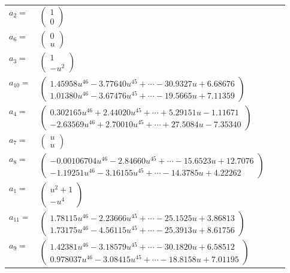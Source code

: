 \documentclass[1p]{elsarticle_modified}
\theoremstyle{definition}
\begin{document}
\begin{tabular}{m{7pt} m{180pt} m{7pt} m{180pt} }
\flushright $a_{2}=$&$\begin{pmatrix}1\\0\end{pmatrix}$ \\
\flushright $a_{6}=$&$\begin{pmatrix}0\\u\end{pmatrix}$ \\
\flushright $a_{3}=$&$\begin{pmatrix}1\\- u^2\end{pmatrix}$ \\
\flushright $a_{10}=$&$\begin{pmatrix}1.45958 u^{46}-3.77640 u^{45}+\cdots-30.9327 u+6.68676\\1.01380 u^{46}-3.67476 u^{45}+\cdots-19.5665 u+7.11359\end{pmatrix}$ \\
\flushright $a_{4}=$&$\begin{pmatrix}0.302165 u^{46}+2.44020 u^{45}+\cdots+5.29151 u-1.11671\\-2.63569 u^{46}+2.70010 u^{45}+\cdots+27.5084 u-7.35340\end{pmatrix}$ \\
\flushright $a_{7}=$&$\begin{pmatrix}u\\u\end{pmatrix}$ \\
\flushright $a_{8}=$&$\begin{pmatrix}-0.00106704 u^{46}-2.84660 u^{45}+\cdots-15.6523 u+12.7076\\-1.19251 u^{46}-3.16155 u^{45}+\cdots-14.3785 u+4.22262\end{pmatrix}$ \\
\flushright $a_{1}=$&$\begin{pmatrix}u^2+1\\- u^4\end{pmatrix}$ \\
\flushright $a_{11}=$&$\begin{pmatrix}1.78115 u^{46}-2.23666 u^{45}+\cdots-25.1525 u+3.86813\\1.73175 u^{46}-4.56115 u^{45}+\cdots-25.3913 u+8.61756\end{pmatrix}$ \\
\flushright $a_{9}=$&$\begin{pmatrix}1.42381 u^{46}-3.18579 u^{45}+\cdots-30.1820 u+6.58512\\0.978037 u^{46}-3.08415 u^{45}+\cdots-18.8158 u+7.01195\end{pmatrix}$ \\

\end{tabular}
\end{document}
